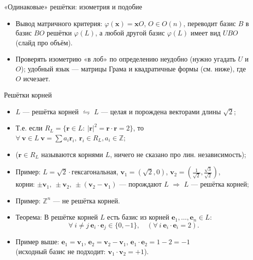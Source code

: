 \documentclass[serif, aspectratio=169]{beamer}
\begin{document}
\begin{frame}{«Одинаковые» решётки: изометрия и подобие}
{\begin{itemize}
            \item Вывод матричного критерия: $\varphi(\mathbf{x})=\mathbf{x}O$, $O\in O(n)$, переводит базис $B$ в базис $BO$ решётки $\varphi(L)$, а любой другой базис $\varphi(L)$ имеет вид $UBO$ (слайд про объём).
            \item Проверять изометрию «в лоб» по определению неудобно (нужно угадать $U$ и $O$); удобный язык --- матрицы Грама и квадратичные формы (см. ниже), где $O$ исчезает.
        \end{itemize}
    }
\end{frame}

\begin{frame}{Решётки корней}
    \begin{itemize}
        \item $L$ --- решётка корней $\leftrightharpoons$ $L$ --- целая и порождена векторами длины $\sqrt2$;
        \item Т.е. если $R_L=\{\mathbf{r}\in L:\ |\mathbf{r}|^2=\mathbf{r}\cdot \mathbf{r}=2\}$, то $\forall\ \mathbf{v}\in L\ \mathbf{v}=\sum a_i \mathbf{r}_i,\ \mathbf{r}_i\in R_L, a_i\in\mathbb{Z}$;
        \item ($\mathbf{r}\in R_L$ называются корнями $L$, ничего не сказано про лин. независимость);
        \item Пример: $L=\sqrt2\cdot$гексагональная, $\mathbf{v}_1=(\sqrt2,0)$, $\mathbf{v}_2=(\frac{1}{\sqrt2},\frac{\sqrt3}{\sqrt2})$,\\ корни: $\pm\mathbf{v}_1,\ \pm\mathbf{v}_2,\ \pm(\mathbf{v}_2-\mathbf{v}_1)$ --- порождают $L$ $\Rightarrow$ $L$ --- решётка корней;
        \item Пример: $\mathbb{Z}^n$ --- не решётка корней.
        \item Теорема: В решётке корней $L$ есть базис из корней $\mathbf{e}_1,\dots,\mathbf{e}_n\in L$:
        \[\forall\ i\neq j\ \mathbf{e}_i\cdot\mathbf{e}_j\in\{0,-1\},\quad (\forall\ i\ \mathbf{e}_i\cdot\mathbf{e}_i=2).\]
        \item Пример выше: $\mathbf{e}_1=\mathbf{v}_1$, $\mathbf{e}_2=\mathbf{v}_2-\mathbf{v}_1$, $\mathbf{e}_1\cdot\mathbf{e}_2=1-2=-1$\\ (исходный базис не подходит: $\mathbf{v}_1\cdot\mathbf{v}_2=+1$).
    \end{itemize}
\end{frame}
\end{document}
